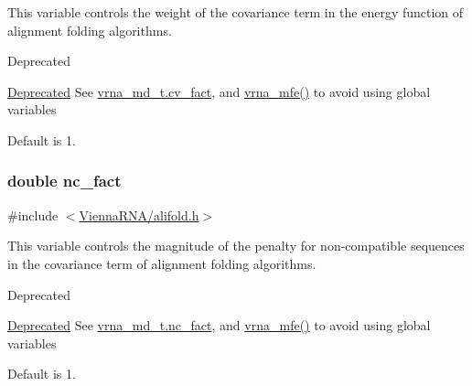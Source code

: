 This variable controls the weight of the covariance term in the energy function of alignment folding algorithms. 

\begin{DoxyRefDesc}{Deprecated}
\item[\hyperlink{deprecated__deprecated000016}{Deprecated}]See \hyperlink{structvrna__md__s_a62ebefb9d0643e5c4c8a2ec84a105ce6}{vrna\+\_\+md\+\_\+t.\+cv\+\_\+fact}, and \hyperlink{group__mfe__fold_gabd3b147371ccf25c577f88bbbaf159fd}{vrna\+\_\+mfe()} to avoid using global variables\end{DoxyRefDesc}


Default is 1. 
\subsubsection[{\texorpdfstring{nc\+\_\+fact}{nc_fact}}]{\setlength{\rightskip}{0pt plus 5cm}double nc\+\_\+fact}\hypertarget{group__consensus__fold_ga502948a122a2af5b914355b1f3ea2f61}{}\label{group__consensus__fold_ga502948a122a2af5b914355b1f3ea2f61}


{\ttfamily \#include $<$\hyperlink{alifold_8h}{Vienna\+R\+N\+A/alifold.\+h}$>$}



This variable controls the magnitude of the penalty for non-\/compatible sequences in the covariance term of alignment folding algorithms. 

\begin{DoxyRefDesc}{Deprecated}
\item[\hyperlink{deprecated__deprecated000017}{Deprecated}]See \hyperlink{structvrna__md__s_abcf568e6124bfcb2f847ff4eb0dfded6}{vrna\+\_\+md\+\_\+t.\+nc\+\_\+fact}, and \hyperlink{group__mfe__fold_gabd3b147371ccf25c577f88bbbaf159fd}{vrna\+\_\+mfe()} to avoid using global variables\end{DoxyRefDesc}


Default is 1. 